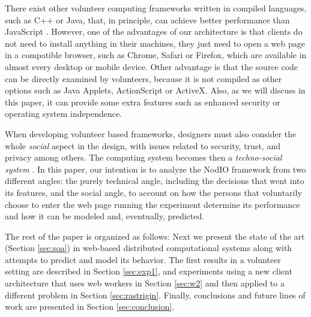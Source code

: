\documentclass[journal,onecolumn]{IEEEtran}
\begin{document}
There exist other volunteer computing frameworks written in compiled languages,
such as C++ or Java, that, in principle, can achieve better performance than
JavaScript \cite{2015arXiv151101088M}. However, one of the advantages of our architecture is that
clients do not need to install anything in their machines, they just
need to open a web page  
in a compatible browser, such as Chrome, Safari or Firefox, which are
available in almost every desktop or mobile device. Other advantage is
that the source code can be directly examined by volunteers, because it is not
compiled as other options such as Java Applets, ActionScript or
ActiveX.
Also, as we will discuss in this paper, it can provide some extra
features such as enhanced security or operating system independence. 


When developing volunteer based frameworks, designers must
also consider the whole {\em social} aspect in the design, with
issues related to security, trust, and privacy among others. 
The computing system becomes then a {\em techno-social system} \cite{vespignani2009predicting}.  
In this paper, our intention is to
analyze the {\sf NodIO} framework from two different
angles: the purely technical angle, including the decisions that went
into its features, and the social angle, to account on how the persons
that voluntarily choose to enter the web page running the experiment
determine its performance and how it can be modeled and, eventually,
predicted.

The rest of the paper is organized as follows: Next we present the
state of the art (Section \ref{sec:soa}) in web-based distributed
computational systems along with attempts to predict and model its
behavior. The first results in a volunteer setting are described
in Section \ref{sec:exp1}, and experiments using a new client
architecture that uses web workers in Section \ref{sec:w2} and then
applied to a different problem in Section \ref{sec:rastrigin}. 
Finally, conclusions and future lines of work are presented in Section
\ref{sec:conclusion}. 
\end{document}
